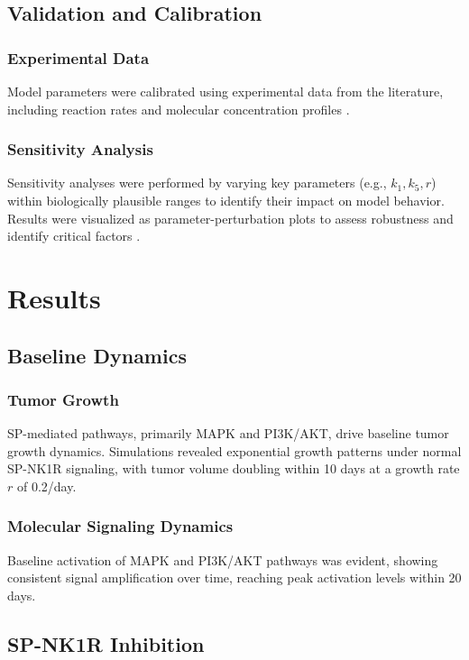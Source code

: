\documentclass{article}
\theoremstyle{plain}
\theoremstyle{definition}
\begin{document}
\subsection{Validation and Calibration}

\subsubsection{Experimental Data}
Model parameters were calibrated using experimental data from the literature, including reaction rates and molecular concentration profiles \cite{lee2022drugResistance}.

\subsubsection{Sensitivity Analysis}
Sensitivity analyses were performed by varying key parameters (e.g., \(k_1, k_5, r\)) within biologically plausible ranges to identify their impact on model behavior. Results were visualized as parameter-perturbation plots to assess robustness and identify critical factors \cite{kim2019modeling}.
\section{Results}

\subsection{Baseline Dynamics}

\subsubsection{Tumor Growth}
SP-mediated pathways, primarily MAPK and PI3K/AKT, drive baseline tumor growth dynamics. Simulations revealed exponential growth patterns under normal SP-NK1R signaling, with tumor volume doubling within 10 days at a growth rate \( r \) of 0.2/day.

\subsubsection{Molecular Signaling Dynamics}
Baseline activation of MAPK and PI3K/AKT pathways was evident, showing consistent signal amplification over time, reaching peak activation levels within 20 days.

\subsection{SP-NK1R Inhibition}
\end{document}
